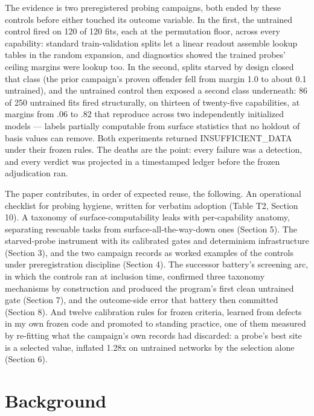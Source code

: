 The evidence is two preregistered probing campaigns, both ended by
these controls before either touched its outcome variable. In the
first, the untrained control fired on 120 of 120 fits, each at the
permutation floor, across every capability: standard train-validation
splits let a linear readout assemble lookup tables in the random
expansion, and diagnostics showed the trained probes' ceiling margins
were lookup too. In the second, splits starved by design closed that
class (the prior campaign's proven offender fell from margin 1.0 to
about 0.1 untrained), and the untrained control then exposed a second
class underneath: 86 of 250 untrained fits fired structurally, on
thirteen of twenty-five capabilities, at margins from .06 to .82 that
reproduce across two independently initialized models --- labels
partially computable from surface statistics that no holdout of basis
values can remove. Both experiments returned INSUFFICIENT\_DATA under
their frozen rules. The deaths are the point: every failure was a
detection, and every verdict was projected in a timestamped ledger
before the frozen adjudication ran.

The paper contributes, in order of expected reuse, the following. An
operational checklist for probing hygiene, written for verbatim
adoption (Table T2, Section 10). A taxonomy of surface-computability
leaks with per-capability anatomy, separating rescuable tasks from
surface-all-the-way-down ones (Section 5). The starved-probe
instrument with its calibrated gates and determinism infrastructure
(Section 3), and the two campaign records as worked examples of the
controls under preregistration discipline (Section 4). The successor
battery's screening arc, in which the controls ran at inclusion time,
confirmed three taxonomy mechanisms by construction and produced the
program's first clean untrained gate (Section 7), and the outcome-side
error that battery then committed (Section 8). And twelve calibration
rules for frozen criteria, learned from defects in my own frozen code
and promoted to standing practice, one of them measured by re-fitting
what the campaign's own records had discarded: a probe's best site is
a selected value, inflated 1.28x on untrained networks by the
selection alone (Section 6).

\section{Background}\label{background}

